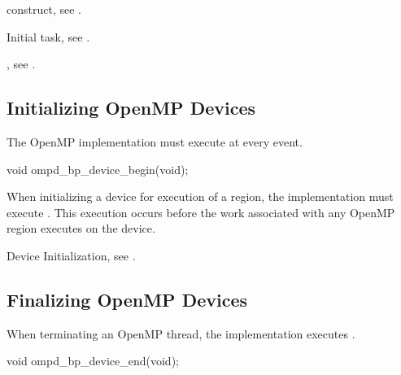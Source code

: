 \begin{crossrefs}
\item {} construct, see .

\item Initial task, see .

\item {}, 
see .
\end{crossrefs}



\subsection{Initializing OpenMP Devices}
\label{subsubsec:ompd_bp_device_begin}

\summary
The OpenMP implementation must execute  
at every  event.

\format
\begin{cspecific}
\begin{ompSyntax}
void ompd_bp_device_begin(void);
\end{ompSyntax}
\end{cspecific}

\descr
When initializing a device for execution of a  region, 
the implementation must execute .
This execution occurs before the work associated with any 
OpenMP region executes on the device.

\begin{crossrefs}
\item Device Initialization, see .
\end{crossrefs}



\subsection{Finalizing OpenMP Devices}
\label{subsubsec:ompd_bp_device_end}

\summary
When terminating an OpenMP thread, the implementation 
executes .

\format
\begin{cspecific}
\begin{ompSyntax}
void ompd_bp_device_end(void);
\end{ompSyntax}
\end{cspecific}

